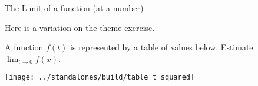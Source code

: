 \documentclass[../main.tex]{subfiles}
\begin{document}
\begin{lesson}{The Limit of a function (at a number)}
  
  Here is a variation-on-the-theme exercise.
  \begin{example}
    A function \(f(t)\) is represented by a table of values below. Estimate \(\lim_{t \to 0} f(x)\).

    \hspace{2in} \texttt{[image: ../standalones/build/table\_t\_squared]}
  \end{example}
\end{lesson}
\end{document}

